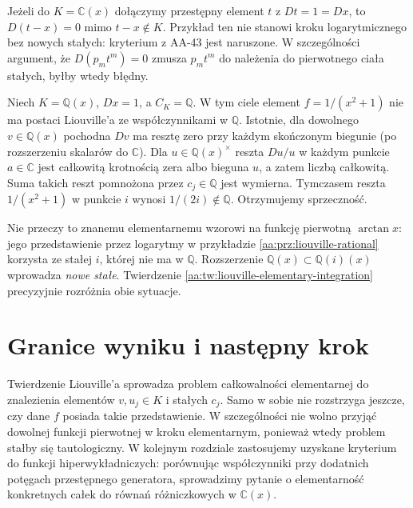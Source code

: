 \begin{przyklad}
\label{aa:prz:liouville-new-constants}
Jeżeli do $K=\mathbb C(x)$ dołączymy
przestępny element $t$ z $Dt=1=Dx$,
to $D(t-x)=0$ mimo $t-x\notin K$.
Przykład ten nie stanowi kroku
logarytmicznego bez nowych stałych:
kryterium z AA-43 jest naruszone.
W szczególności argument, że
$D(p_mt^m)=0$ zmusza $p_mt^m$ do należenia
do pierwotnego ciała stałych, byłby wtedy błędny.
\end{przyklad}

\begin{przyklad}
\label{aa:prz:liouville-nonclosed-constants}
Niech $K=\mathbb Q(x)$, $Dx=1$, a $C_K=\mathbb Q$.
W tym ciele element $f=1/(x^2+1)$ nie ma
postaci Liouville'a ze współczynnikami w $\mathbb Q$.
Istotnie, dla dowolnego $v\in\mathbb Q(x)$ pochodna
$Dv$ ma resztę zero przy każdym skończonym biegunie
(po rozszerzeniu skalarów do $\mathbb C$).
Dla $u\in\mathbb Q(x)^\times$ reszta $Du/u$
w każdym punkcie $a\in\mathbb C$ jest całkowitą
krotnością zera albo bieguna $u$, a zatem liczbą
całkowitą. Suma takich reszt pomnożona przez
$c_j\in\mathbb Q$ jest wymierna. Tymczasem
reszta $1/(x^2+1)$ w punkcie $i$ wynosi
$1/(2i)\notin\mathbb Q$. Otrzymujemy sprzeczność.

Nie przeczy to znanemu elementarnemu wzorowi na
funkcję pierwotną $\arctan x$: jego przedstawienie
przez logarytmy w przykładzie
\ref{aa:prz:liouville-rational} korzysta ze
stałej $i$, której nie ma w $\mathbb Q$.
Rozszerzenie $\mathbb Q(x)\subset\mathbb Q(i)(x)$
wprowadza \emph{nowe stałe}. Twierdzenie
\ref{aa:tw:liouville-elementary-integration}
precyzyjnie rozróżnia obie sytuacje.
\end{przyklad}

\section{Granice wyniku i następny krok}

Twierdzenie Liouville'a sprowadza problem
całkowalności elementarnej do znalezienia
elementów $v,u_j\in K$ i stałych $c_j$.
Samo w sobie nie rozstrzyga jeszcze,
czy dane $f$ posiada takie przedstawienie.
W szczególności nie wolno przyjąć dowolnej
funkcji pierwotnej w kroku elementarnym,
ponieważ wtedy problem stałby się tautologiczny.
W kolejnym rozdziale zastosujemy uzyskane
kryterium do funkcji hiperwykładniczych:
porównując współczynniki przy dodatnich
potęgach przestępnego generatora,
sprowadzimy pytanie o elementarność konkretnych
całek do równań różniczkowych w $\mathbb C(x)$.

